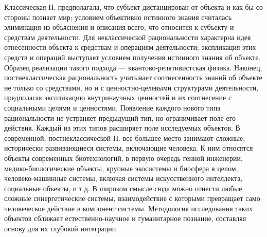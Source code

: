 \documentclass[a4paper,12pt]{article}
\begin{document}
Классическая Н. предполагала, что субъект дистанцирован от объекта и как бы со стороны познает мир; условием объективно истинного знания считалась элиминация из объяснения и описания всего, что относится к субъекту и средствам деятельности. Для неклассической рациональности характерна идея отнесенности объекта к средствам и операциям деятельности; экспликация этих средств и операций выступает условием получения истинного знания об объекте. Образец реализации такого подхода — квантово-релятивистская физика. Наконец, постнеклассическая рациональность учитывает соотнесенность знаний об объекте не только со средствами, но и с ценностно-целевыми структурами деятельности, предполагая экспликацию внутринаучных ценностей и их соотнесение с социальными целями и ценностями. 
Появление каждого нового типа рациональности не устраняет предыдущий тип, но ограничивает поле его действия. Каждый из этих типов расширяет поле исследуемых объектов. 
В современной, постнеклассической Н. все большее место занимают сложные, исторически развивающиеся системы, включающие человека. К ним относятся объекты современных биотехнологий, в первую очередь генной инженерии, медико-биологические объекты, крупные экосистемы и биосфера в целом, человеко-машинные системы, включая системы искусственного интеллекта, социальные объекты, и т.д. 
В широком смысле сюда можно отнести любые сложные синергетические системы, взаимодействие с которыми превращает само человеческое действие в компонент системы. Методология исследования таких объектов сближает естественно-научное и гуманитарное познание, составляя основу для их глубокой интеграции.
\end{document}
